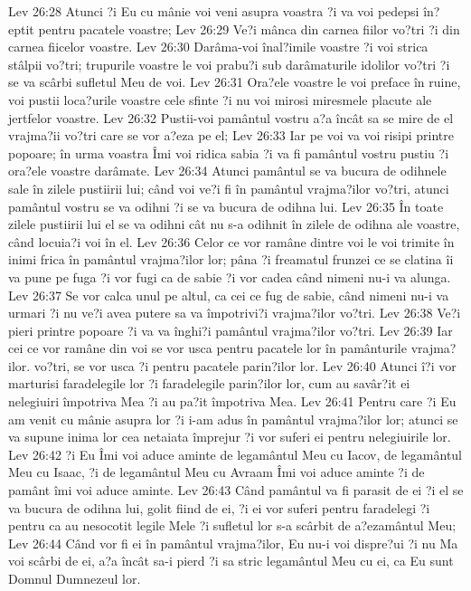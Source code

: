 Lev 26:28  Atunci ?i Eu cu mânie voi veni asupra voastra ?i va voi pedepsi în?eptit pentru pacatele voastre;
Lev 26:29  Ve?i mânca din carnea fiilor vo?tri ?i din carnea fiicelor voastre.
Lev 26:30  Darâma-voi înal?imile voastre ?i voi strica stâlpii vo?tri; trupurile voastre le voi prabu?i sub darâmaturile idolilor vo?tri ?i se va scârbi sufletul Meu de voi.
Lev 26:31  Ora?ele voastre le voi preface în ruine, voi pustii loca?urile voastre cele sfinte ?i nu voi mirosi miresmele placute ale jertfelor voastre.
Lev 26:32  Pustii-voi pamântul vostru a?a încât sa se mire de el vrajma?ii vo?tri care se vor a?eza pe el;
Lev 26:33  Iar pe voi va voi risipi printre popoare; în urma voastra Îmi voi ridica sabia ?i va fi pamântul vostru pustiu ?i ora?ele voastre darâmate.
Lev 26:34  Atunci pamântul se va bucura de odihnele sale în zilele pustiirii lui; când voi ve?i fi în pamântul vrajma?ilor vo?tri, atunci pamântul vostru se va odihni ?i se va bucura de odihna lui.
Lev 26:35  În toate zilele pustiirii lui el se va odihni cât nu s-a odihnit în zilele de odihna ale voastre, când locuia?i voi în el.
Lev 26:36  Celor ce vor ramâne dintre voi le voi trimite în inimi frica în pamântul vrajma?ilor lor; pâna ?i freamatul frunzei ce se clatina îi va pune pe fuga ?i vor fugi ca de sabie ?i vor cadea când nimeni nu-i va alunga.
Lev 26:37  Se vor calca unul pe altul, ca cei ce fug de sabie, când nimeni nu-i va urmari ?i nu ve?i avea putere sa va împotrivi?i vrajma?ilor vo?tri.
Lev 26:38  Ve?i pieri printre popoare ?i va va înghi?i pamântul vrajma?ilor vo?tri.
Lev 26:39  Iar cei ce vor ramâne din voi se vor usca pentru pacatele lor în pamânturile vrajma?ilor. vo?tri, se vor usca ?i pentru pacatele parin?ilor lor.
Lev 26:40  Atunci î?i vor marturisi faradelegile lor ?i faradelegile parin?ilor lor, cum au savâr?it ei nelegiuiri împotriva Mea ?i au pa?it împotriva Mea.
Lev 26:41  Pentru care ?i Eu am venit cu mânie asupra lor ?i i-am adus în pamântul vrajma?ilor lor; atunci se va supune inima lor cea netaiata împrejur ?i vor suferi ei pentru nelegiuirile lor.
Lev 26:42  ?i Eu Îmi voi aduce aminte de legamântul Meu cu Iacov, de legamântul Meu cu Isaac, ?i de legamântul Meu cu Avraam Îmi voi aduce aminte ?i de pamânt îmi voi aduce aminte.
Lev 26:43  Când pamântul va fi parasit de ei ?i el se va bucura de odihna lui, golit fiind de ei, ?i ei vor suferi pentru faradelegi ?i pentru ca au nesocotit legile Mele ?i sufletul lor s-a scârbit de a?ezamântul Meu;
Lev 26:44  Când vor fi ei în pamântul vrajma?ilor, Eu nu-i voi dispre?ui ?i nu Ma voi scârbi de ei, a?a încât sa-i pierd ?i sa stric legamântul Meu cu ei, ca Eu sunt Domnul Dumnezeul lor.
